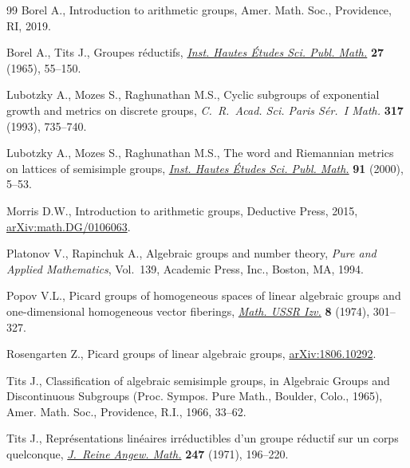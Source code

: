 \documentclass[11pt]{article}
\numberwithin{equation}{section}
\numberwithin{equation}{section}
\theoremstyle{definition}
\begin{document}
\begin{thebibliography}{99}
Borel A., Introduction to arithmetic groups, Amer. Math. Soc., Providence, RI,
 2019.

Borel A., Tits J., Groupes r\'eductifs, \href{https://doi.org/10.1007/BF02684375}{\textit{Inst. Hautes \'Etudes Sci. Publ. Math.}} \textbf{27} (1965), 55--150.

Lubotzky A., Mozes S., Raghunathan M.S., Cyclic subgroups of exponential growth
 and metrics on discrete groups, \textit{C.~R.~Acad. Sci. Paris S\'er.~I
 Math.} \textbf{317} (1993), 735--740.

Lubotzky A., Mozes S., Raghunathan M.S., The word and {R}iemannian metrics on
 lattices of semisimple groups, \href{https://doi.org/10.1007/BF02698740}{\textit{Inst. Hautes \'Etudes Sci. Publ. Math.}} \textbf{91} (2000), 5--53.

Morris D.W., Introduction to arithmetic groups, Deductive Press, 2015,
 \href{https://arxiv.org/abs/math.DG/0106063}{arXiv:math.DG/0106063}.

Platonov V., Rapinchuk A., Algebraic groups and number theory, \textit{Pure and
 Applied Mathematics}, Vol.~139, Academic Press, Inc., Boston, MA, 1994.

Popov V.L., Picard groups of homogeneous spaces of linear algebraic groups and
 one-dimensional homogeneous vector fiberings, \href{https://doi.org/10.1070/IM1974v008n02ABEH002107}{\textit{Math. USSR Izv.}}
 \textbf{8} (1974), 301--327.

Rosengarten Z., Picard groups of linear algebraic groups, \href{https://arxiv.org/abs/1806.10292}{arXiv:1806.10292}.

Tits J., Classification of algebraic semisimple groups, in Algebraic {G}roups
 and {D}iscontinuous {S}ubgroups ({P}roc. {S}ympos. {P}ure {M}ath., {B}oulder,
 {C}olo., 1965), Amer. Math. Soc., Providence, R.I., 1966, 33--62.

Tits J., Repr\'esentations lin\'eaires irr\'eductibles d'un groupe r\'eductif
 sur un corps quelconque, \href{https://doi.org/10.1515/crll.1971.247.196}{\textit{J.~Reine Angew. Math.}} \textbf{247} (1971), 196--220.

\end{thebibliography}
\end{document}
